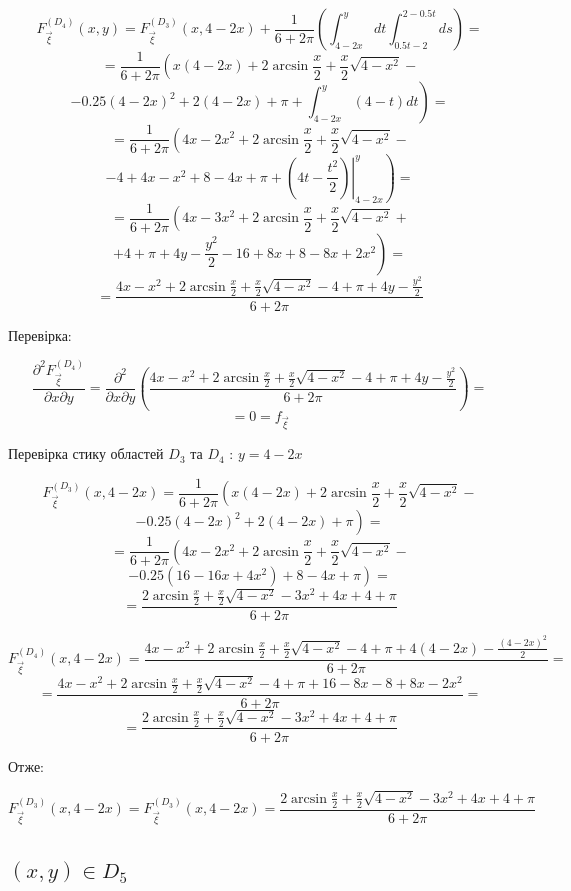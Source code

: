 \documentclass[14pt, a4paper, ukrainian]{extreport}
\begin{document}
	$$ F_{\vec \xi}^{\left(D_4\right)}(x, y) = F_{\vec \xi}^{\left(D_3\right)}(x, 4 - 2x) + \frac{1}{6+2\pi}\left(\int_{4-2x}^{y}dt\int_{0.5t - 2}^{2 - 0.5t}ds \right)= 
	$$
	$$ = \frac{1}{6+2\pi}\left(x(4-2x) + 2\arcsin\frac{x}{2} + \frac{x}{2}\sqrt{4-x^2} -  \right.
	$$
	$$ - 0.25(4-2x)^2 + 2(4-2x) + \left. \pi + \int_{4-2x}^{y}(4-t)dt\right) = 
	$$
	$$ = \frac{1}{6+2\pi}\left(4x - 2x^2 + 2\arcsin\frac{x}{2} + \frac{x}{2}\sqrt{4-x^2} -  \right.
	$$
	$$ - 4 + 4x -x^2 + 8-4x + \left. \pi + \left.\left(4t - \frac{t^2}{2}\right)\right|_{4-2x}^{y}\right) = 
	$$
	$$ = \frac{1}{6+2\pi}\left(4x - 3x^2 + 2\arcsin\frac{x}{2} + \frac{x}{2}\sqrt{4-x^2} +  \right.
	$$
	$$ + \left. 4 + \pi + 4y - \frac{y^2}{2} - 16 + 8x + 8 - 8x + 2x^2\right) = 
	$$
	$$ = \frac{4x -x^2 + 2\arcsin\frac{x}{2} + \frac{x}{2}\sqrt{4-x^2} - 4 + \pi + 4y - \frac{y^2}{2}}{6+2\pi} 
	$$
	
	Перевірка:
	
	$$\frac{\partial^2F_{\vec\xi}^{\left(D_4\right)}}{\partial x \partial y} = \frac{\partial^2}{\partial x \partial y}\left(\frac{4x - x^2 + 2\arcsin\frac{x}{2} + \frac{x}{2}\sqrt{4-x^2} - 4 + \pi + 4y - \frac{y^2}{2}}{6+2\pi}\right) = 
	$$
	$$ = 0 = f_{\vec\xi}
	$$
	
	Перевірка стику областей $D_3$ та $D_4$ : $ y = 4 - 2x$
	
	$$ F_{\vec\xi}^{\left({D_3}\right)}(x, 4 - 2x) = \frac{1}{6+2\pi} \left(x(4-2x) + 2\arcsin\frac{x}{2} + \frac{x}{2}\sqrt{4-x^2} -\right.
	$$
	$$ \left. - 0.25(4 - 2x)^2 + 2(4 - 2x) + \pi\right) =
	$$
	$$ = \frac{1}{6+2\pi} \left(4x - 2x^2 + 2\arcsin\frac{x}{2} + \frac{x}{2}\sqrt{4-x^2} -\right.
	$$
	$$ \left. - 0.25(16 - 16x + 4x^2) + 8 - 4x + \pi\right) =
	$$ 
	$$= \frac{2\arcsin\frac{x}{2} + \frac{x}{2}\sqrt{4-x^2} - 3x^2 + 4x + 4 + \pi}{6+2\pi}
	$$ 
	
	$$ F_{\vec\xi}^{\left({D_4}\right)}(x, 4 - 2x) = \frac{4x -x^2 + 2\arcsin\frac{x}{2} + \frac{x}{2}\sqrt{4-x^2} - 4 + \pi + 4(4-2x) - \frac{(4-2x)^2}{2}}{6+2\pi} = 
	$$
	$$ = \frac{4x -x^2 + 2\arcsin\frac{x}{2} + \frac{x}{2}\sqrt{4-x^2} - 4 + \pi + 16 -8x - 8 + 8x - 2x^2}{6+2\pi} = 
	$$ 
	$$ = \frac{2\arcsin\frac{x}{2} + \frac{x}{2}\sqrt{4-x^2} - 3x^2 + 4x + 4 + \pi}{6+2\pi}
	$$ 
	
	Отже:
	
	$$  F_{\vec\xi}^{\left({D_3}\right)}(x, 4-2x) =  F_{\vec\xi}^{\left({D_3}\right)}(x, 4-2x) = \frac{2\arcsin\frac{x}{2} + \frac{x}{2}\sqrt{4-x^2} - 3x^2 + 4x + 4 + \pi}{6+2\pi}
	$$
	
	\subsection{$(x, y) \in D_5$}
	
\end{document}
